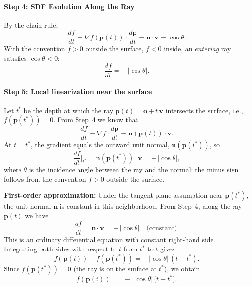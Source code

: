 \begin{enrichment}
\begin{enrichment}
        \paragraph{Step 4: SDF Evolution Along the Ray}
        By the chain rule,
        \begin{equation}
            \frac{df}{dt} = \nabla f(\mathbf{p}(t)) \cdot \frac{d\mathbf{p}}{dt}
            = \mathbf{n} \cdot \mathbf{v} = \cos\theta.
        \end{equation}
        With the convention $f > 0$ outside the surface, $f < 0$ inside, an \emph{entering} ray satisfies $\cos\theta < 0$:
        \begin{equation}
            \frac{df}{dt} = -\,|\cos\theta|.
        \end{equation}
        
        \paragraph{Step 5: Local linearization near the surface}
        Let $t^*$ be the depth at which the ray $\mathbf{p}(t) = \mathbf{o} + t\,\mathbf{v}$ intersects the surface, i.e., $f(\mathbf{p}(t^*)) = 0$.  
        From Step~4 we know that 
        \[
        \frac{df}{dt} = \nabla f \cdot \frac{d\mathbf{p}}{dt} = \mathbf{n}(\mathbf{p}(t)) \cdot \mathbf{v}.
        \]
        At $t = t^*$, the gradient equals the outward unit normal, $\mathbf{n}(\mathbf{p}(t^*))$, so
        \[
        \frac{df}{dt}\Big|_{t^*} = \mathbf{n}(\mathbf{p}(t^*)) \cdot \mathbf{v} = -\,|\cos\theta|,
        \]
        where $\theta$ is the incidence angle between the ray and the normal; the minus sign follows from the convention $f>0$ outside the surface.
        
        \medskip
        \noindent\textbf{First-order approximation:}  
        Under the tangent-plane assumption near $\mathbf{p}(t^*)$, the unit normal $\mathbf{n}$ is constant in this neighborhood.  
        From Step~4, along the ray $\mathbf{p}(t)$ we have
        \[
        \frac{df}{dt} = \mathbf{n} \cdot \mathbf{v} = -\,|\cos\theta| \quad \text{(constant)}.
        \]
        This is an ordinary differential equation with constant right-hand side.  
        Integrating both sides with respect to $t$ from $t^*$ to $t$ gives
        \[
        f(\mathbf{p}(t)) - f(\mathbf{p}(t^*)) = -\,|\cos\theta|\,(t - t^*).
        \]
        Since $f(\mathbf{p}(t^*)) = 0$ (the ray is on the surface at $t^*$), we obtain
        \begin{equation}
            f(\mathbf{p}(t)) \;=\; -\,|\cos\theta|\,\big(t - t^*\big).
        \end{equation}
        

\end{enrichment}
\end{enrichment}
